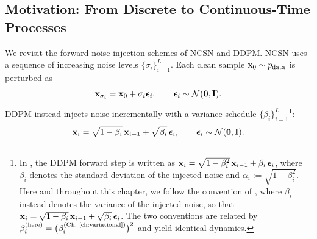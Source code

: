 \subsection{Motivation: From Discrete to Continuous-Time Processes}\label{subsec:scoresde-motivation}

We revisit the forward noise injection schemes of NCSN and DDPM. NCSN uses a sequence of increasing noise levels $\{\sigma_i\}_{i=1}^L$. 
Each clean sample ${\mathbf{x}}_0 \sim p_{\mathrm{data}}$ is perturbed as
\[
{\mathbf{x}}_{\sigma_i} = {\mathbf{x}}_0 + \sigma_i \bm{\epsilon}_i, 
\qquad \bm{\epsilon}_i \sim \mathcal{N}(\bm{0}, {\mathbf{I}}).
\]
DDPM instead injects noise incrementally with a variance schedule $\{\beta_i\}_{i=1}^L$\footnote{In , the DDPM forward step is written as ${\mathbf{x}}_i = \sqrt{1-\beta_i^2}\,{\mathbf{x}}_{i-1} + \beta_i\,\bm{\epsilon}_i$, where $\beta_i$ denotes the standard deviation of the injected noise and $\alpha_i := \sqrt{1-\beta_i^2}$. Here and throughout this chapter, we follow the convention of \citet{song2020score}, where $\beta_i$ instead denotes the variance of the injected noise, so that ${\mathbf{x}}_i = \sqrt{1-\beta_i}\,{\mathbf{x}}_{i-1} + \sqrt{\beta_i}\,\bm{\epsilon}_i$. The two conventions are related by $\beta_i^{\textup{(here)}} = \bigl(\beta_i^{\textup{(Ch.\ \ref{ch:variational})}}\bigr)^2$ and yield identical dynamics.}:
\[
{\mathbf{x}}_i = \sqrt{1 - \beta_i}\, {\mathbf{x}}_{i-1} + \sqrt{\beta_i}\, \bm{\epsilon}_i, 
\qquad \bm{\epsilon}_i \sim \mathcal{N}(\bm{0}, {\mathbf{I}}).
\]


